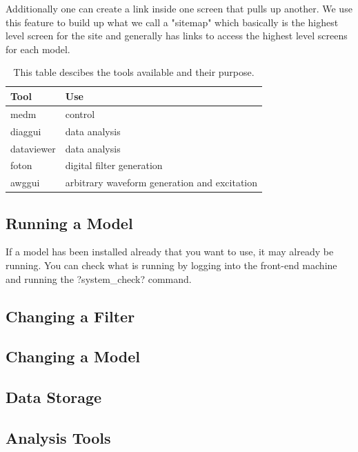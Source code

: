 Additionally one can create a link inside one screen that pulls up another. We
use this feature to build up what we call a "sitemap" which basically is the
highest level screen for the site and generally has links to access the
highest level screens for each model.

\begin{table}
\begin{center}
\begin{tabular}{ | l | l | }
\hline
Tool & Use \\
\hline
medm & control \\
diaggui & data analysis \\
dataviewer & data analysis \\
foton & digital filter generation \\
awggui & arbitrary waveform generation and excitation \\
\hline
\end{tabular}
\end{center}
\caption[Front-End Tools]{This table descibes the tools available and their
purpose.
}
\label{table:fetools}
\end{table}

\subsection{Running a Model}

If a model has been installed already that you want to use, it may already be
running. You can check what is running by logging into the front-end machine
and running the \lstin?system_check? command.

\subsection{Changing a Filter}

\subsection{Changing a Model}

\subsection{Data Storage}

\subsection{Analysis Tools}


